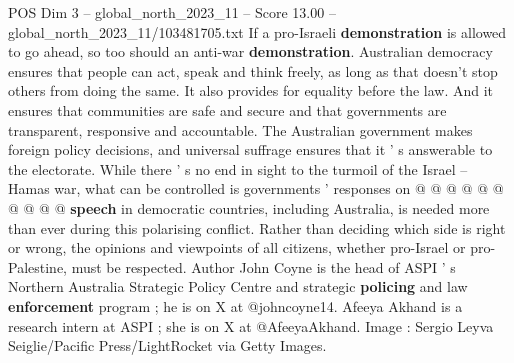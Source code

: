 \begin{textsample}{POS Dim 3 – global\_north\_2023\_11 – Score 13.00 – global\_north\_2023\_11/103481705.txt}
If a pro-Israeli \textbf{demonstration} is allowed to go ahead, so too should an anti-war \textbf{demonstration}.
Australian democracy ensures that people can act, speak and think freely, as long as that doesn't stop others from doing the same.
It also provides for equality before the law.
And it ensures that communities are safe and secure and that governments are transparent, responsive and accountable.
The Australian government makes foreign policy decisions, and universal suffrage ensures that it ' s answerable to the electorate.
While there ' s no end in sight to the turmoil of the Israel -- Hamas war, what can be controlled is governments ' responses on @ @ @ @ @ @ @ @ @ @ \textbf{speech} in democratic countries, including Australia, is needed more than ever during this polarising conflict.
Rather than deciding which side is right or wrong, the opinions and viewpoints of all citizens, whether pro-Israel or pro-Palestine, must be respected.
Author John Coyne is the head of ASPI ' s Northern Australia Strategic Policy Centre and strategic \textbf{policing} and law \textbf{enforcement} program ; he is on X at @johncoyne14.
Afeeya Akhand is a research intern at ASPI ; she is on X at @AfeeyaAkhand.
Image : Sergio Leyva Seiglie/Pacific Press/LightRocket via Getty Images.

\end{textsample}
